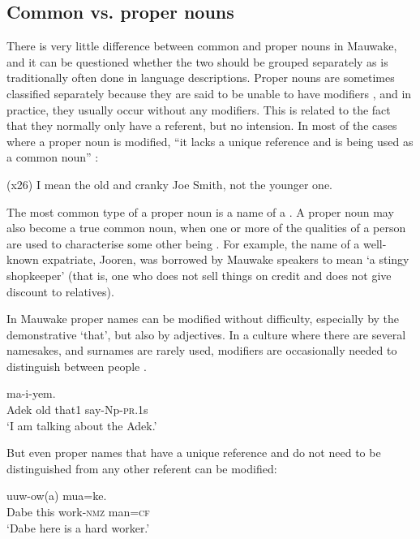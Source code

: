 \subsection{Common vs. proper nouns}\label{sec:3:2:3}
{}
There is very little difference between common and proper nouns in Mauwake, and it can be questioned whether the two should be grouped separately as is traditionally often done in language descriptions. Proper nouns are sometimes classified separately because they are said to be unable to have modifiers \citep[152]{Roberts1987}, and in practice, they usually occur without any modifiers. This is related to the fact that they normally only have a referent, but no intension. In most of the cases where a proper noun is modified, ``it lacks a unique reference and is being used as a common noun'' \citep[59]{VanValinEtAl1997}:

 (x26) I mean the old and cranky Joe Smith, not the younger one. 

The most common type of a proper noun is a name of a . A proper noun may also become a true common noun, when one or more of the qualities of a person are used to characterise some other being \citep[66]{Jespersen1924}. For example, the name of a well-known expatriate, Jooren, was borrowed by Mauwake speakers to mean `a stingy shopkeeper' (that is, one who does not sell things on credit and does not give discount to relatives). 

In Mauwake proper names can be modified without difficulty, especially by the demonstrative  `that', but also by adjectives. In a culture where there are several namesakes, and surnames are rarely used, modifiers are occasionally needed to distinguish between people .

\ea%
\label{ex:3:x27}
\gll {}   ma-i-yem. \\
Adek old that1 say-Np-\textsc{pr}.1s\\
\glt`I am talking about the  Adek.'
\z

But even proper names that have a unique reference and do not need to be distinguished from any other referent can be modified:

\ea%
\label{ex:3:x106}
\gll {}  uuw-ow(a) mua=ke. \\
Dabe this work-\textsc{nmz} man=\textsc{cf}\\
\glt`Dabe here is a hard worker.'
\z

